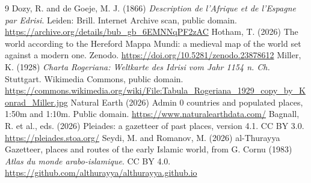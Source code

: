 \documentclass[11pt,a4paper]{article}
\begin{document}
\begin{thebibliography}{9}
 Dozy, R. and de Goeje, M. J. (1866) \textit{Description de l'Afrique et de l'Espagne par Edrisi}. Leiden: Brill. Internet Archive scan, public domain. \url{https://archive.org/details/bub_gb_6EMNNqPF2zAC}
 Hotham, T. (2026) The world according to the Hereford Mappa Mundi: a medieval map of the world set against a modern one. Zenodo. \url{https://doi.org/10.5281/zenodo.23878612}
 Miller, K. (1928) \textit{Charta Rogeriana: Weltkarte des Idrisi vom Jahr 1154 n. Ch.} Stuttgart. Wikimedia Commons, public domain. \url{https://commons.wikimedia.org/wiki/File:Tabula_Rogeriana_1929_copy_by_Konrad_Miller.jpg}
 Natural Earth (2026) Admin 0 countries and populated places, 1:50m and 1:10m. Public domain. \url{https://www.naturalearthdata.com/}
 Bagnall, R. et al., eds. (2026) Pleiades: a gazetteer of past places, version 4.1. CC BY 3.0. \url{https://pleiades.stoa.org/}
 Seydi, M. and Romanov, M. (2026) al-Thurayya Gazetteer, places and routes of the early Islamic world, from G. Cornu (1983) \textit{Atlas du monde arabo-islamique}. CC BY 4.0. \url{https://github.com/althurayya/althurayya.github.io}
\end{thebibliography}

\clearpage
\appendix
\end{document}

